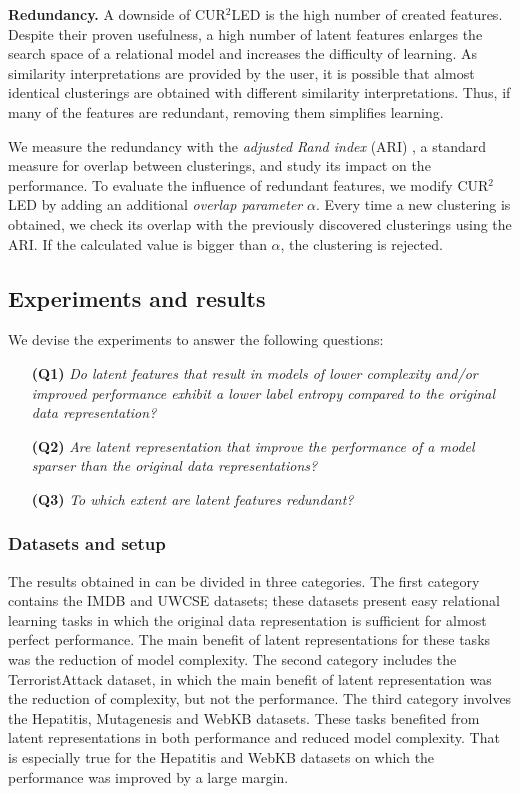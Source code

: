\textbf{Redundancy.}
A downside of CUR$^2$LED is the high number of  created features.
Despite their proven usefulness, a high number of latent features enlarges the search space of a relational model and increases the difficulty of learning.
As similarity interpretations are provided by the user, it is possible that almost identical clusterings are obtained with different similarity interpretations.
Thus, if many of the features are redundant, removing them simplifies learning.

We measure the redundancy with the \textit{adjusted Rand index} (ARI) \cite{Rand71,MoreyARI}, a standard measure for overlap between clusterings, and study its impact on the performance.
To evaluate the influence of redundant features, we modify CUR$^2$LED by adding an additional \textit{overlap parameter} $\alpha$.
Every time a new clustering is obtained, we check its overlap with the previously discovered clusterings using the ARI.
If the calculated value is bigger than $\alpha$, the clustering is rejected.



\subsection{Experiments and results}

We devise the experiments to answer the following questions:
\begin{itemize}
    \item[\textbf{(Q1)}] \textit{Do latent features that result in models of lower complexity and/or improved performance exhibit a lower label entropy compared to the original data representation?}
    \item[\textbf{(Q2)}] \textit{Are latent representation that improve the performance of a model sparser than the original data representations?}
    \item[\textbf{(Q3)}] \textit{To which extent are latent features redundant?}
\end{itemize}

\subsubsection{Datasets and setup}

The results  obtained in \cite{Dumancic2017} can be divided in three categories.
The first category contains the IMDB and UWCSE datasets; these datasets present easy relational learning tasks in which the original data representation is sufficient for almost perfect performance.
The main benefit of latent representations for these tasks was the reduction of model complexity.
The second category includes the TerroristAttack dataset, in which the main benefit of latent representation was the reduction of complexity, but not the performance.
The third category involves the Hepatitis, Mutagenesis and WebKB datasets.
These tasks benefited from latent representations in both performance and reduced model complexity.
That is especially true for the Hepatitis and WebKB datasets on which the performance was improved by a large margin.


